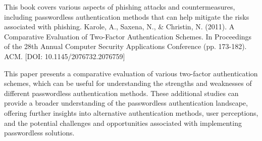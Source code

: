 This book covers various aspects of phishing attacks and countermeasures, including passwordless authentication methods that can help mitigate the risks associated with phishing.
Karole, A., Saxena, N., & Christin, N. (2011). A Comparative Evaluation of Two-Factor Authentication Schemes. In Proceedings of the 28th Annual Computer Security Applications Conference (pp. 173-182). ACM. [DOI: 10.1145/2076732.2076759]

This paper presents a comparative evaluation of various two-factor authentication schemes, which can be useful for understanding the strengths and weaknesses of different passwordless authentication methods.
These additional studies can provide a broader understanding of the passwordless authentication landscape, offering further insights into alternative authentication methods, user perceptions, and the potential challenges and opportunities associated with implementing passwordless solutions.

\fi